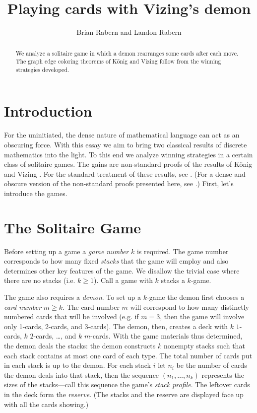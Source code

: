 \documentclass[12pt]{article}
\title{Playing cards with Vizing's demon}
\author{Brian Rabern and Landon Rabern}
\theoremstyle{plain}
\theoremstyle{definition}
\theoremstyle{remark}
\begin{document}
\maketitle
\begin{abstract}
We analyze a solitaire game in which a demon rearranges some cards after each move.  The graph edge coloring theorems of K\H{o}nig and Vizing follow from the winning strategies developed.
\end{abstract}

\section{Introduction}
For the uninitiated, the dense nature of mathematical language can act as an obscuring force.  With this essay we aim to bring two classical results of discrete mathematics into the light.  To this end we analyze winning strategies in a certain class of solitaire games.  The gains are non-standard proofs of the results of K\H{o}nig \cite{konig} and Vizing \cite{vizing}.  For the standard treatment of these results, see \cite{stiebitz}.  (For a dense and obscure version of the non-standard proofs presented here, see \cite{rabern2012game}.)  First, let's introduce the games.

\section{The Solitaire Game}

Before setting up a game a \textit{game number} $k$ is required. The game number corresponds to how many fixed \textit{stacks} that the game will employ and also determines other key features of the game.  We disallow the trivial case where there are no stacks (i.e. $k \geq 1$). Call a game with $k$ stacks a $k$-game.

The game also requires a \textit{demon}. To set up a $k$-game the demon first chooses a \textit{card number} $m\geq k$. The card number $m$ will correspond to how many distinctly numbered cards that will be involved (e.g. if $m = 3$, then the game will involve only 1-cards, 2-cards, and 3-cards). The demon, then, creates a deck with $k$ $1$-cards, $k$ $2$-cards, \ldots, and $k$ $m$-cards. With the game materials thus determined, the demon deals the stacks: the demon constructs $k$ nonempty stacks such that each stack contains at most one card of each type.  The total number of cards put in each stack is up to the demon. For each stack $i$ let $n_i$ be the number of cards the demon deals into that stack, then the sequence $(n_1, \ldots, n_k)$ represents the sizes of the stacks---call this sequence the game's \textit{stack profile}. The leftover cards in the deck form the \textit{reserve}. (The stacks and the reserve are displayed face up with all the cards showing.)
\end{document}
